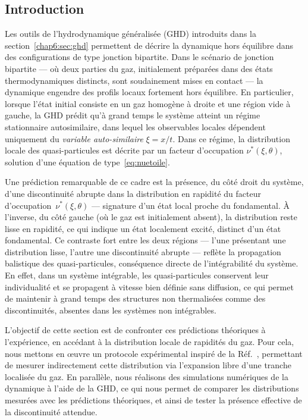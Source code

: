 \subsection*{Introduction}
Les outils de l'hydrodynamique généralisée (GHD) introduits dans la section~\ref{chap6:sec:ghd} permettent de décrire la dynamique hors équilibre dans des configurations de type jonction bipartite.
Dans le scénario de jonction bipartite — où deux parties du gaz, initialement préparées dans des états thermodynamiques distincts, sont soudainement mises en contact — la dynamique engendre des profils locaux fortement hors équilibre. En particulier, lorsque l’état initial consiste en un gaz homogène à droite et une région vide à gauche, la GHD prédit qu’à grand temps le système atteint un régime stationnaire autosimilaire, dans lequel les observables locales dépendent uniquement du {\em variable auto-similaire} $\xi = x/t$. Dans ce régime, la distribution locale des quasi-particules est décrite par un facteur d’occupation $\nu^*(\xi,\theta)$, solution d’une équation de type~\eqref{eq:nuetoile}.

\medskip

Une prédiction remarquable de ce cadre est la présence, du côté droit du système, d’une discontinuité abrupte dans la distribution en rapidité du facteur d’occupation~$\nu^*(\xi,\theta)$ — signature d’un état local proche du fondamental. À l’inverse, du côté gauche (où le gaz est initialement absent), la distribution reste lisse en rapidité, ce qui indique un état localement excité, distinct d’un état fondamental. Ce contraste fort entre les deux régions — l’une présentant une distribution lisse, l’autre une discontinuité abrupte — reflète la propagation balistique des quasi-particules, conséquence directe de l’intégrabilité du système. En effet, dans un système intégrable, les quasi-particules conservent leur individualité et se propagent à vitesse bien définie sans diffusion, ce qui permet de maintenir à grand temps des structures non thermalisées comme des discontinuités, absentes dans les systèmes non intégrables.

\medskip

L’objectif de cette section est de confronter ces prédictions théoriques à l’expérience, en accédant à la distribution locale de rapidités du gaz. Pour cela, nous mettons en œuvre un protocole expérimental inspiré de la Réf.~\cite{dubois_probing_2024}, permettant de mesurer indirectement cette distribution via l’expansion libre d’une tranche localisée du gaz. En parallèle, nous réalisons des simulations numériques de la dynamique à l’aide de la GHD, ce qui nous permet de comparer les distributions mesurées avec les prédictions théoriques, et ainsi de tester la présence effective de la discontinuité attendue.

